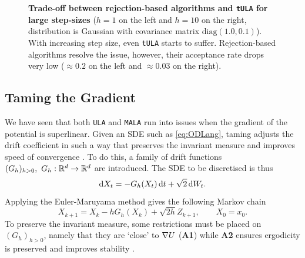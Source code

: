 \begin{figure}[H]
\begin{minipage}[b]{0.49\textwidth}
  \end{minipage}
   \caption{\textbf{Trade-off between rejection-based algorithms and \texttt{tULA} for large step-sizes} ($h = 1$ on the left and $h = 10$ on the right, distribution is Gaussian with covariance matrix $\text{diag}(1.0, 0.1)$). With increasing step size, even \texttt{tULA} starts to suffer. Rejection-based algorithms resolve the issue, however, their acceptance rate drops very low ($\approx 0.2$ on the left and $\approx 0.03$ on the right). }
\end{figure}

\subsection{Taming the Gradient}
We have seen that both \texttt{ULA} and \texttt{MALA} run into issues when the gradient of the potential is superlinear. Given an SDE such as \eqref{eq:ODLang}, taming adjusts the drift coefficient in such a way that preserves the invariant measure and improves speed of convergence \cite{Brosse18tULA,RT96,Sabanis13}. To do this, a family of drift functions \((G_h)_{h>0}, \ G_h:\mathbb{R}^d \to \mathbb{R}^d\) are introduced. The SDE to be discretised is thus
	\begin{equation*} \mathop{}\!\mathrm{d} X_t = -G_h(X_t)\mathop{}\!\mathrm{d} t +\sqrt{2}\mathop{}\!\mathrm{d} W_t. \end{equation*}
Applying the Euler-Maruyama method gives the following Markov chain
	\[X_{k+1} =X_k-hG_h(X_k)+\sqrt{2h}Z_{k+1},\qquad  X_0=x_0.\]
To preserve the invariant measure, some restrictions must be placed on \((G_h)_{h>0}\), namely that they are `close' to \(\nabla U\) ({\bf A1}) while {\bf A2} ensures ergodicity is preserved and improves stability \cite{Brosse18tULA}. 

